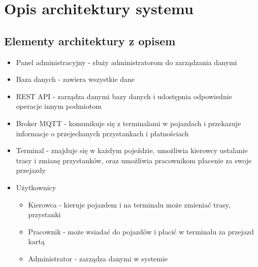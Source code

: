 \section{Opis architektury systemu}
\subsection{Elementy architektury z opisem}
\begin{itemize}
  \item{Panel administracyjny - służy administratorom do zarządzania danymi}
  \item{Baza danych - zawiera wszystkie dane}
  \item{REST API - zarządza danymi bazy danych i udostępnia odpowiednie operacje innym podmiotom}
  \item{Broker MQTT - komunikuje się z terminalami w pojazdach i przekazuje informacje o przejechanych przystankach i płatnościach}
  \item{Terminal - znajduje się w każdym pojeździe, umożliwia kierowcy ustalanie trasy i zmianę przystanków, oraz umożliwia pracownikom płacenie za swoje przejazdy}
  \item{
    Użytkownicy
    \begin{itemize}
      \item{Kierowca - kieruje pojazdem i na terminalu może zmieniać trasy, przystanki}
      \item{Pracownik - może wsiadać do pojazdów i płacić w terminalu za przejazd kartą}
      \item{Administrator - zarządza danymi w systemie}
    \end{itemize}
  }
\end{itemize}
